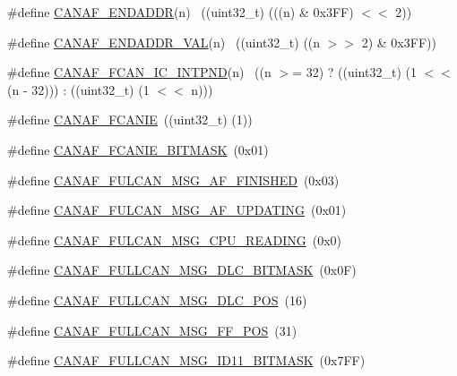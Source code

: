 \begin{DoxyCompactItemize}
\item 
\#define \hyperlink{group__CAN__17XX__40XX_ga5ba3176aaf46ab587a3cda7bffb44a01}{C\+A\+N\+A\+F\+\_\+\+E\+N\+D\+A\+D\+DR}(n)          ~((uint32\+\_\+t) (((n) \& 0x3\+F\+F) $<$$<$ 2))
\item 
\#define \hyperlink{group__CAN__17XX__40XX_ga6c32331278430946e33a9c24b876b9ba}{C\+A\+N\+A\+F\+\_\+\+E\+N\+D\+A\+D\+D\+R\+\_\+\+V\+AL}(n)  ~((uint32\+\_\+t) ((n $>$$>$ 2) \& 0x3\+F\+F))
\item 
\#define \hyperlink{group__CAN__17XX__40XX_gaae7c734823148f3854e3f8c9142b0d2b}{C\+A\+N\+A\+F\+\_\+\+F\+C\+A\+N\+\_\+\+I\+C\+\_\+\+I\+N\+T\+P\+ND}(n)  ~((n $>$= 32) ? ((uint32\+\_\+t) (1 $<$$<$ (n -\/ 32))) \+: ((uint32\+\_\+t) (1 $<$$<$ n)))
\item 
\#define \hyperlink{group__CAN__17XX__40XX_gaa88dea898eb0dc46abbe7257d73c3d55}{C\+A\+N\+A\+F\+\_\+\+F\+C\+A\+N\+IE}~((uint32\+\_\+t) (1))
\item 
\#define \hyperlink{group__CAN__17XX__40XX_gacdb9df29363290a810f83bac6a4c449b}{C\+A\+N\+A\+F\+\_\+\+F\+C\+A\+N\+I\+E\+\_\+\+B\+I\+T\+M\+A\+SK}~(0x01)
\item 
\#define \hyperlink{group__CAN__17XX__40XX_ga0703ff937d013317ff346514af620c01}{C\+A\+N\+A\+F\+\_\+\+F\+U\+L\+C\+A\+N\+\_\+\+M\+S\+G\+\_\+\+A\+F\+\_\+\+F\+I\+N\+I\+S\+H\+ED}~(0x03)
\item 
\#define \hyperlink{group__CAN__17XX__40XX_ga7faed980dda1c2c2425f2c135a13ded0}{C\+A\+N\+A\+F\+\_\+\+F\+U\+L\+C\+A\+N\+\_\+\+M\+S\+G\+\_\+\+A\+F\+\_\+\+U\+P\+D\+A\+T\+I\+NG}~(0x01)
\item 
\#define \hyperlink{group__CAN__17XX__40XX_gabd6b90de26c04aa196f9fa61da8b5fd0}{C\+A\+N\+A\+F\+\_\+\+F\+U\+L\+C\+A\+N\+\_\+\+M\+S\+G\+\_\+\+C\+P\+U\+\_\+\+R\+E\+A\+D\+I\+NG}~(0x0)
\item 
\#define \hyperlink{group__CAN__17XX__40XX_gaf1d8388c9f6b6a15e1d338eb1dd03114}{C\+A\+N\+A\+F\+\_\+\+F\+U\+L\+L\+C\+A\+N\+\_\+\+M\+S\+G\+\_\+\+D\+L\+C\+\_\+\+B\+I\+T\+M\+A\+SK}~(0x0\+F)
\item 
\#define \hyperlink{group__CAN__17XX__40XX_gac926e34803050930adc9784f6f6432c3}{C\+A\+N\+A\+F\+\_\+\+F\+U\+L\+L\+C\+A\+N\+\_\+\+M\+S\+G\+\_\+\+D\+L\+C\+\_\+\+P\+OS}~(16)
\item 
\#define \hyperlink{group__CAN__17XX__40XX_ga3fc8e9c8da63067c48ef7c7789980f45}{C\+A\+N\+A\+F\+\_\+\+F\+U\+L\+L\+C\+A\+N\+\_\+\+M\+S\+G\+\_\+\+F\+F\+\_\+\+P\+OS}~(31)
\item 
\#define \hyperlink{group__CAN__17XX__40XX_ga3b7e29cacfe97518e0947fa70cd2073e}{C\+A\+N\+A\+F\+\_\+\+F\+U\+L\+L\+C\+A\+N\+\_\+\+M\+S\+G\+\_\+\+I\+D11\+\_\+\+B\+I\+T\+M\+A\+SK}~(0x7\+F\+F)

\end{DoxyCompactItemize}

